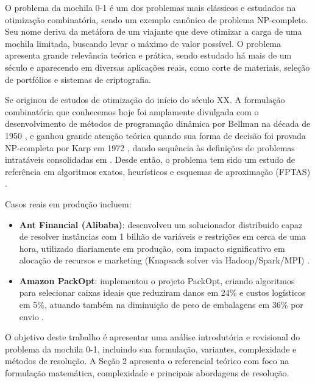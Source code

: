 O problema da mochila 0-1 é um dos problemas mais clássicos e estudados na otimização combinatória, sendo um exemplo canônico de problema NP-completo.
Seu nome deriva da metáfora de um viajante que deve otimizar a carga de uma mochila limitada, buscando levar o máximo de valor possível.
O problema apresenta grande relevância teórica e prática, sendo estudado há mais de um século e aparecendo em diversas aplicações reais,
como corte de materiais, seleção de portfólios e sistemas de criptografia. 

Se originou de estudos de otimização do início do século XX. A formulação combinatória que conhecemos hoje foi amplamente divulgada com o desenvolvimento de métodos de programação dinâmica por Bellman na década de 1950 \cite{nemhauser1988},
e ganhou grande atenção teórica quando sua forma de decisão foi provada NP-completa por Karp em 1972 \cite{karp1972},
dando sequência às definições de problemas intratáveis consolidadas em \cite{garey1979}. 
Desde então, o problema tem sido um estudo de referência em algoritmos exatos,
 heurísticos e esquemas de aproximação (FPTAS) \cite{ibarra1975,jin2019}.

Casos reais em produção incluem:

\begin{itemize}
  \item \textbf{Ant Financial (Alibaba)}: desenvolveu um solucionador distribuido capaz de resolver instâncias com 1 bilhão de variáveis e restrições em cerca de uma hora, utilizado diariamente em produção, com impacto significativo em alocação de recursos e marketing (Knapsack solver via Hadoop/Spark/MPI) \cite{alibaba2020}.
  
  \item \textbf{Amazon PackOpt}: implementou o projeto PackOpt, criando algoritmos para selecionar caixas ideais que reduziram danos em 24\% e custos logísticos em 5\%, atuando também na diminuição de peso de embalagens em 36\% por envio  \cite{amazon2020}.
\end{itemize}

O objetivo deste trabalho é apresentar uma análise introdutória e revisional do problema da mochila 0-1,
incluindo sua formulação, variantes, complexidade e métodos de resolução. 
A Seção 2 apresenta o referencial teórico com foco na formulação matemática, complexidade e principais abordagens de resolução.
